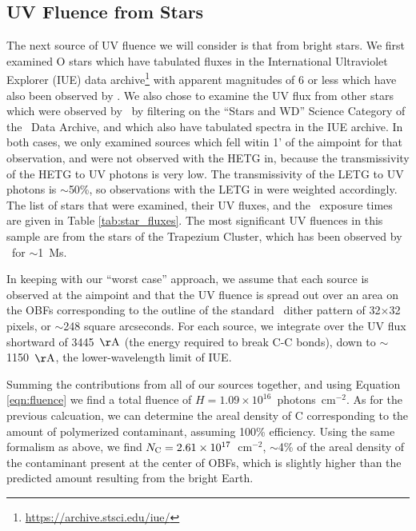 \documentclass[11pt]{article}
\begin{document}
\subsection{UV Fluence from Stars}\label{sec:stars}

The next source of UV fluence we will consider is that from bright stars. We first examined O stars which have tabulated
fluxes in the International Ultraviolet Explorer (IUE) data archive\footnote{\url{https://archive.stsci.edu/iue/}} with
apparent magnitudes of 6 or less which have also been observed by \chandra. We also chose to examine the UV flux from
other stars which were observed by \chandra~by filtering on the ``Stars and WD'' Science Category of the \chandra~Data
Archive, and which also have tabulated spectra in the IUE archive. In both cases, we only examined sources which fell
witin 1' of the aimpoint for that observation, and were not observed with the HETG in, because the transmissivity of
the HETG to UV photons is very low. The transmissivity of the LETG to UV photons is $\sim$50\%, so observations with
the LETG in were weighted accordingly. The list of stars that were examined, their UV fluxes, and the \chandra~exposure
times are given in Table \ref{tab:star_fluxes}. The most significant UV fluences in this sample are from the stars of
the Trapezium Cluster, which has been observed by \chandra~for $\sim$1~Ms.



In keeping with our ``worst case'' approach, we assume that each source is observed at the aimpoint and that the UV
fluence is spread out over an area on the OBFs corresponding to the outline of the standard \chandra~dither pattern of
32$\times$32 pixels, or $\sim$248 square arcseconds. For each source, we integrate over the UV flux shortward of
3445~${\rm \AA}$ (the energy required to break C-C bonds), down to $\sim$1150~${\rm \AA}$, the lower-wavelength limit
of IUE.

Summing the contributions from all of our sources together, and using Equation \ref{eqn:fluence} we find a total
fluence of $H = 1.09 \times 10^{16}$~photons~cm$^{-2}$. As for the previous calcuation, we can determine the areal
density of C corresponding to the amount of polymerized contaminant, assuming 100\% efficiency. Using the same formalism
as above, we find $N_{\rm C} = 2.61 \times 10^{17}$~cm$^{-2}$, $\sim$4\% of the areal density of the contaminant present
at the center of OBFs, which is slightly higher than the predicted amount resulting from the bright Earth.
\end{document}
